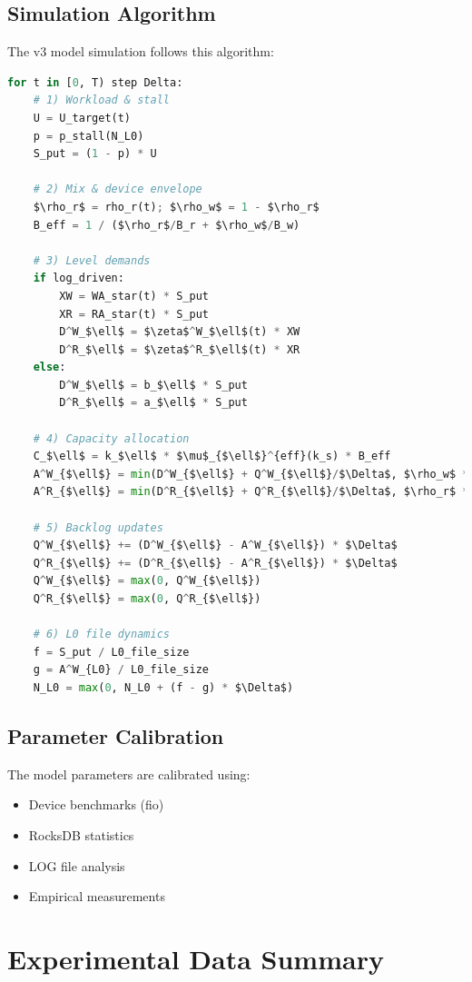 \documentclass[11pt,twocolumn]{article}
\begin{document}
\subsection{Simulation Algorithm}

The v3 model simulation follows this algorithm:

\begin{lstlisting}[language=Python]
for t in [0, T) step Delta:
    # 1) Workload & stall
    U = U_target(t)
    p = p_stall(N_L0)
    S_put = (1 - p) * U
    
    # 2) Mix & device envelope
    $\rho_r$ = rho_r(t); $\rho_w$ = 1 - $\rho_r$
    B_eff = 1 / ($\rho_r$/B_r + $\rho_w$/B_w)
    
    # 3) Level demands
    if log_driven:
        XW = WA_star(t) * S_put
        XR = RA_star(t) * S_put
        D^W_$\ell$ = $\zeta$^W_$\ell$(t) * XW
        D^R_$\ell$ = $\zeta$^R_$\ell$(t) * XR
    else:
        D^W_$\ell$ = b_$\ell$ * S_put
        D^R_$\ell$ = a_$\ell$ * S_put
    
    # 4) Capacity allocation
    C_$\ell$ = k_$\ell$ * $\mu$_{$\ell$}^{eff}(k_s) * B_eff
    A^W_{$\ell$} = min(D^W_{$\ell$} + Q^W_{$\ell$}/$\Delta$, $\rho_w$ * C_{$\ell$})
    A^R_{$\ell$} = min(D^R_{$\ell$} + Q^R_{$\ell$}/$\Delta$, $\rho_r$ * C_{$\ell$})
    
    # 5) Backlog updates
    Q^W_{$\ell$} += (D^W_{$\ell$} - A^W_{$\ell$}) * $\Delta$
    Q^R_{$\ell$} += (D^R_{$\ell$} - A^R_{$\ell$}) * $\Delta$
    Q^W_{$\ell$} = max(0, Q^W_{$\ell$})
    Q^R_{$\ell$} = max(0, Q^R_{$\ell$})
    
    # 6) L0 file dynamics
    f = S_put / L0_file_size
    g = A^W_{L0} / L0_file_size
    N_L0 = max(0, N_L0 + (f - g) * $\Delta$)
\end{lstlisting}

\subsection{Parameter Calibration}

The model parameters are calibrated using:
\begin{itemize}
    \item Device benchmarks (fio)
    \item RocksDB statistics
    \item LOG file analysis
    \item Empirical measurements
\end{itemize}

\section{Experimental Data Summary}
\end{document}
